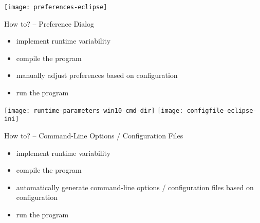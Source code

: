 \begin{frame}{\myframetitle}
	\begin{mycolumns}[widths={40},T]
		\texttt{[image: preferences-eclipse]}

		\begin{definition}{How to? -- Preference Dialog}
			\begin{itemize}
				\item implement runtime variability
				\item compile the program
				\item manually adjust preferences based on configuration
				\item run the program
			\end{itemize}
		\end{definition}
	\mynextcolumn
		\begin{mycolumns}[animation=none]
			\texttt{[image: runtime-parameters-win10-cmd-dir]}
		\mynextcolumn
			\texttt{[image: configfile-eclipse-ini]}
		\end{mycolumns}

		\begin{definition}{How to? -- Command-Line Options / Configuration Files}
			\begin{itemize}
				\item implement runtime variability
				\item compile the program
				\item automatically generate command-line options / configuration files based on configuration
				\item run the program
			\end{itemize}
		\end{definition}
	\end{mycolumns}
\end{frame}

